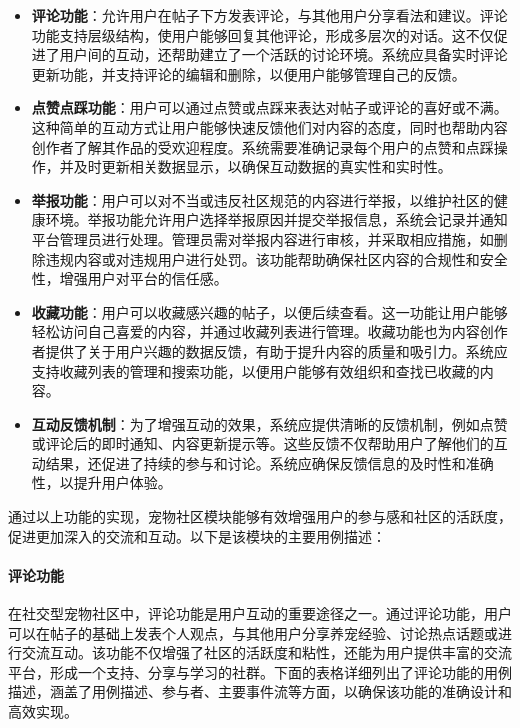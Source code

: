 \begin{itemize}
	\item \textbf{评论功能}：允许用户在帖子下方发表评论，与其他用户分享看法和建议。评论功能支持层级结构，使用户能够回复其他评论，形成多层次的对话。这不仅促进了用户间的互动，还帮助建立了一个活跃的讨论环境。系统应具备实时评论更新功能，并支持评论的编辑和删除，以便用户能够管理自己的反馈。
	\item \textbf{点赞点踩功能}：用户可以通过点赞或点踩来表达对帖子或评论的喜好或不满。这种简单的互动方式让用户能够快速反馈他们对内容的态度，同时也帮助内容创作者了解其作品的受欢迎程度。系统需要准确记录每个用户的点赞和点踩操作，并及时更新相关数据显示，以确保互动数据的真实性和实时性。
	\item \textbf{举报功能}：用户可以对不当或违反社区规范的内容进行举报，以维护社区的健康环境。举报功能允许用户选择举报原因并提交举报信息，系统会记录并通知平台管理员进行处理。管理员需对举报内容进行审核，并采取相应措施，如删除违规内容或对违规用户进行处罚。该功能帮助确保社区内容的合规性和安全性，增强用户对平台的信任感。
	\item \textbf{收藏功能}：用户可以收藏感兴趣的帖子，以便后续查看。这一功能让用户能够轻松访问自己喜爱的内容，并通过收藏列表进行管理。收藏功能也为内容创作者提供了关于用户兴趣的数据反馈，有助于提升内容的质量和吸引力。系统应支持收藏列表的管理和搜索功能，以便用户能够有效组织和查找已收藏的内容。
	\item \textbf{互动反馈机制}：为了增强互动的效果，系统应提供清晰的反馈机制，例如点赞或评论后的即时通知、内容更新提示等。这些反馈不仅帮助用户了解他们的互动结果，还促进了持续的参与和讨论。系统应确保反馈信息的及时性和准确性，以提升用户体验。
\end{itemize}

通过以上功能的实现，宠物社区模块能够有效增强用户的参与感和社区的活跃度，促进更加深入的交流和互动。以下是该模块的主要用例描述：

\paragraph{评论功能}

在社交型宠物社区中，评论功能是用户互动的重要途径之一。通过评论功能，用户可以在帖子的基础上发表个人观点，与其他用户分享养宠经验、讨论热点话题或进行交流互动。该功能不仅增强了社区的活跃度和粘性，还能为用户提供丰富的交流平台，形成一个支持、分享与学习的社群。下面的表格详细列出了评论功能的用例描述，涵盖了用例描述、参与者、主要事件流等方面，以确保该功能的准确设计和高效实现。

